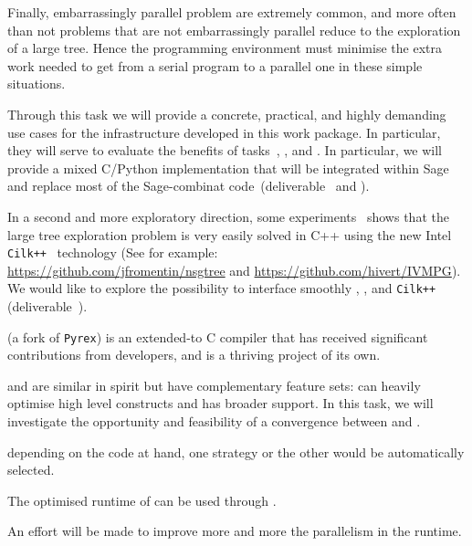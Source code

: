 \begin{workpackage}
\begin{tasklist}
\begin{task}[title=HPC infrastructure for combinatorics,id=hpc-combi,PM=26,lead=PS,partners={UB},wphases={0-6!0.3,12-36!0.5},issue=104]
  Finally, embarrassingly parallel problem are extremely common, and
  more often than not problems that are not embarrassingly parallel
  reduce to the exploration of a large tree. Hence the programming
  environment must minimise the extra work needed to get from a serial
  program to a parallel one in these simple situations.

  Through this task we will provide a concrete, practical, and highly
  demanding use cases for the infrastructure developed in this work
  package. In particular, they will serve to evaluate the benefits of
  tasks~,
  , and
  .
  In particular, we will provide a mixed C/Python implementation that
  will be integrated within Sage and replace most of the Sage-combinat
  code~(deliverable~ 
  and ).

  In a second and more exploratory direction, some
  experiments~\cite{FromentinHivert} shows that the large tree exploration
  problem is very easily solved in C++ using the new Intel
  \texttt{Cilk++}~\cite{CilkIntel,CilkRefman} technology (See for example:\\
  \href{https://github.com/jfromentin/nsgtree}{https://github.com/jfromentin/nsgtree}
  and
  \href{https://github.com/hivert/IVMPG}{https://github.com/hivert/IVMPG}). We
  would like to explore the possibility to interface smoothly \Pythran,
  \Cython, and \texttt{Cilk++} (deliverable~).
\end{task}

\begin{task}[title=Pythran,id=pythran,lead=LL,partners={UJF},PM=24, wphases=0-24, issue=105]
  \Cython (a fork of \texttt{Pyrex}) is an extended-\Python to C
  compiler that has received significant contributions from \Sage
  developers, and is a thriving project of its own.

  \Pythran and \Cython are similar in spirit but have complementary feature
  sets: \Pythran can heavily optimise high level \Numpy constructs and \Cython
  has broader \Python support. In this task, we will investigate the
  opportunity and feasibility of a convergence between \Cython and \Pythran.
  \begin{compactitem}
    \item depending on the code at hand, one strategy or the other would be automatically selected.
    \item The optimised runtime of \Pythran can be used through \Cython.
  \end{compactitem}
  An effort will be made to improve more and more the parallelism in the
  \Pythran runtime.


\end{task}
\end{tasklist}
\end{workpackage}
